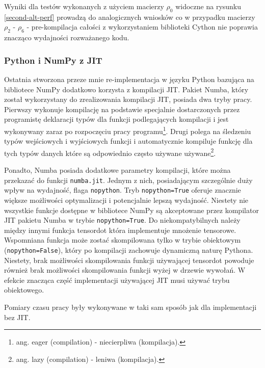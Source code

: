 \documentclass[11pt, a4paper]{article}
\newcommand{\code}[1]{\texttt{#1}}
\begin{document}
\begin{sloppypar}
    Wyniki dla testów wykonanych z użyciem macierzy $\rho_{0}$ widoczne na rysunku \ref{second-alt-perf}
    prowadzą do analogicznych wniosków co w przypadku macierzy $\rho_{2}$ - $\rho_{6}$ -
    pre-kompilacja całości z wykorzystaniem biblioteki Cython nie poprawia znacząco wydajności
    rozważanego kodu.

    \subsubsection{ Python i NumPy z JIT }
    \label{python_numpy_jit}

    Ostatnia stworzona przeze mnie re-implementacja w języku Python bazująca na
    bibliotece NumPy dodatkowo korzysta z kompilacji JIT. Pakiet Numba, który został
    wykorzystany do zrealizowania kompilacji JIT, posiada dwa tryby pracy. Pierwszy
    wykonuje kompilację na podstawie specjalnie dostarczonych przez programistę
    deklaracji typów dla funkcji podlegających kompilacji i jest wykonywany zaraz po
    rozpoczęciu pracy programu\footnote{ang. eager (compilation) - niecierpliwa (kompilacja).}.
    Drugi polega na śledzeniu typów wejściowych i wyjściowych funkcji i automatycznie kompiluje
    funkcję dla tych typów danych które są odpowiednio często używane używane\footnote{ang.
    lazy (compilation) - leniwa (kompilacja).}.

    Ponadto, Numba posiada dodatkowe parametry kompilacji, które można przekazać do funkcji
    \code{numba.jit}. Jednym z nich, posiadającym szczególnie duży wpływ na wydajność, flaga
    \code{nopython}. Tryb \code{nopython=True} oferuje znacznie większe możliwości
    optymalizacji i potencjalnie lepszą wydajność. Niestety nie wszystkie funkcje dostępne
    w bibliotece NumPy są akceptowane przez kompilator JIT pakietu Numba w trybie \code{nopython=True}.
    Do niekompatybilnych należy między innymi funkcja tensordot która implementuje mnożenie
    tensorowe. Wspomniana funkcja może zostać skompilowana tylko w trybie obiektowym (\code{nopython=False}),
    który po kompilacji zachowuje dynamiczną naturę Pythona. Niestety, brak możliwości
    skompilowania funkcji używającej tensordot powoduje również brak możliwości
    skompilowania funkcji wyżej w drzewie wywołań. W efekcie znacząca część implementacji
    używającej JIT musi używać trybu obiektowego.

    Pomiary czasu pracy były wykonywane w taki sam sposób jak dla implementacji bez JIT.


\end{sloppypar}
\end{document}
